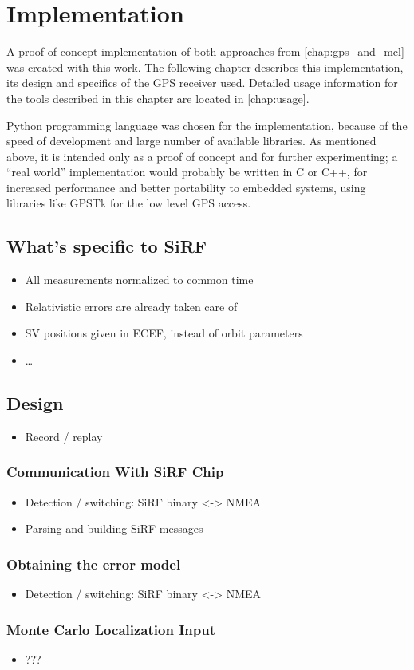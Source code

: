 \chapter{Implementation}
\label{chap:implementation}

A proof of concept implementation of both approaches from \autoref{chap:gps_and_mcl}
was created with this work.
The following chapter describes this implementation, its design and
specifics of the GPS receiver used.
Detailed usage information for the tools described in this chapter are located in
\autoref{chap:usage}.

Python programming language was chosen for the implementation,
because of the speed of development and large number of available libraries.
As mentioned above, it is intended only as a proof of
concept and for further experimenting; a \enquote{real world} implementation
would probably be written in C or C++, for increased performance and better portability
to embedded systems, using libraries like GPSTk \cite{tolman04} for the low level GPS access.

\section{What's specific to SiRF}
\label{sec:impl-sirf}
\begin{itemize}
\item All measurements normalized to common time
\item Relativistic errors are already taken care of
\item SV positions given in ECEF, instead of orbit parameters
\item \ldots
\end{itemize}

\section{Design}
\begin{itemize}
\item Record / replay
\end{itemize}

\subsection{Communication With SiRF Chip}
\begin{itemize}
\item Detection / switching: SiRF binary <-> NMEA
\item Parsing and building SiRF messages
\end{itemize}

\subsection{Obtaining the error model}
\begin{itemize}
\item Detection / switching: SiRF binary <-> NMEA
\end{itemize}

\subsection{Monte Carlo Localization Input}
\begin{itemize}
\item ???
\end{itemize}

